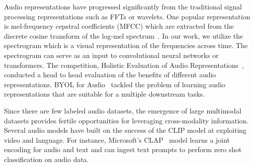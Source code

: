 \documentclass[letterpaper]{article}
\begin{document}
Audio representations have progressed significantly from the traditional signal processing representations such as FFTs or wavelets.  One popular representation is mel-frequency cepstral coefficients (MFCC) which are extracted from the discrete cosine transform of the log-mel spectrum~\cite{mfcc}.  In our work, we utilize the spectrogram which is a visual representation of the frequencies across time.   The spectrogram can serve as an input to convolutional neural networks or transformers.  The competition, Holistic Evaluation of Audio Representations~\cite{turian2022hear}, conducted a head to head evaluation of the benefits of different audio representations.  BYOL for Audio~\cite{niizumi_byol_2023} tackled the problem of learning audio representations that are suitable for a multiple downstream tasks.

Since there are few labeled audio datasets, the emergence of large multimodal datasets provides fertile opportunities for leveraging cross-modality information.  Several audio models have built on the success of the CLIP model at exploiting video and language.  For instance, Microsoft’s CLAP~\cite{elizalde_clap_2022} model learns a joint encoding for audio and text and can ingest text prompts to perform zero shot classification on audio data. 
    
\end{document}
